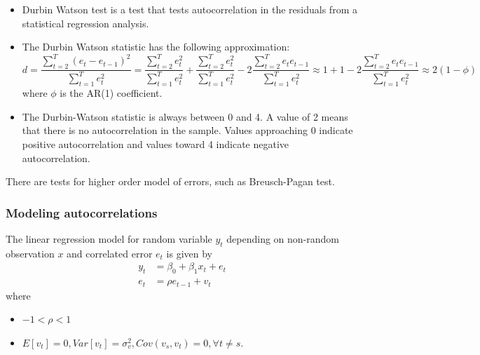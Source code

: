 \begin{refsection}
\begin{remark}[interpretation]\hfill
	\begin{itemize}
		\item Durbin Watson test is a test that tests  autocorrelation in the residuals from a statistical regression analysis.
		\item The Durbin Watson statistic has the following approximation:$$d = \frac{\sum_{t=2}^T (e_t - e_{t-1})^2}{\sum_{t=1}^T e_t^2} = \frac{\sum_{t=2}^T e_t^2}{\sum_{t=1}^T e_t^2}+\frac{\sum_{t=2}^T e_t^2}{\sum_{t=1}^T e_t^2} - 2\frac{\sum_{t=2}^T e_te_{t-1}}{\sum_{t=1}^T e_t^2} \approx 1 + 1 - 2\frac{\sum_{t=2}^T e_te_{t-1}}{\sum_{t=1}^T e_t^2}\approx 2(1 - \phi)$$
		where $\phi$ is the AR(1) coefficient.
		\item The Durbin-Watson statistic is always between 0 and 4. A value of 2 means that there is no autocorrelation in the sample. Values approaching 0 indicate positive autocorrelation and values toward 4 indicate negative autocorrelation.
	\end{itemize}
\end{remark}

\begin{remark}
	There are tests for higher order model of errors, such as Breusch-Pagan test.
\end{remark}


\subsubsection{Modeling autocorrelations}



\begin{definition}\cite[361]{hill2010principles}
The linear regression model for random variable $y_t$ depending on non-random observation $x$ and correlated error $e_t$ is given by 	
\begin{align*}
y_t &= \beta_0 + \beta_1 x_t + e_t \\
e_t & = \rho e_{t-1} + v_t
\end{align*}
where	
\begin{itemize}
	\item $-1< \rho < 1$
	\item $E[v_t] = 0, Var[v_t] = \sigma_v^2, Cov(v_s,v_t) = 0, \forall t\neq s$.
\end{itemize}
\end{definition}

\begin{remark}


\end{remark}
\end{refsection}
